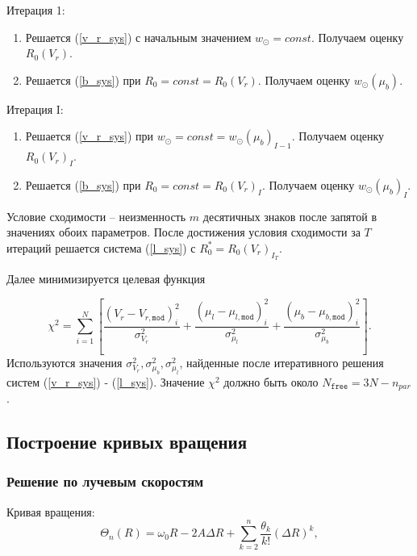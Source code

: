 \documentclass{matmex-diploma-custom}
\begin{document}
Итерация 1:
\begin{enumerate}
        \item Решается (\ref{v_r_sys}) с начальным значением $w_{\odot} = const$. Получаем оценку $R_0(V_r)$.
        \item Решается (\ref{b_sys}) при $R_0 = const = R_0(V_r)$. Получаем оценку $w_{\odot}(\mu_b)$.
\end{enumerate}
\par Итерация I:
\begin{enumerate}
        \item Решается (\ref{v_r_sys}) при $w_{\odot} = const = w_{\odot}(\mu_b)_{I - 1}$. Получаем оценку $R_0(V_r)_I$.
        \item Решается (\ref{b_sys}) при $R_0 = const = R_0(V_r)_I$. Получаем оценку $w_{\odot}(\mu_b)_I$.
\end{enumerate}
Условие сходимости -- неизменность $m$ десятичных знаков после запятой в значениях обоих параметров. После достижения условия сходимости за $T$ итераций решается система (\ref{l_sys}) с $R_0^{*}=R_0(V_r)_{I_T}$.

Далее минимизируется целевая функция

\begin{equation} \label{chi_sq_func}
                \chi^2 = \sum^N_{i = 1} \left[ \frac{\left( V_r - V_{r, \texttt{mod}} \right)^2_i}{\sigma^2_{V_r}} + \frac{\left( \mu_l - \mu_{l, \texttt{mod}} \right)^2_i}{\sigma^2_{\mu_l}} + \frac{\left( \mu_b - \mu_{b, \texttt{mod}} \right)^2_i}{\sigma^2_{\mu_b}} \right].
	\end{equation}
Используются значения $\sigma^2_{V_r}, \sigma^2_{\mu_b}, \sigma^2_{\mu_l}$, найденные после итеративного решения систем (\ref{v_r_sys}) - (\ref{l_sys}). Значение $\chi^2$ должно быть около $N_{\texttt{free}} = 3 N - n_{par}$. 

\pagebreak
\subsection{Построение кривых вращения}
\subsubsection{Решение по лучевым скоростям}
Кривая вращения:
\begin{equation}
        \Theta_n(R) = \omega_0 R - 2A\Delta R + \sum^n_{k = 2} \frac{\theta_k}{k!} \left( \Delta R \right)^k ,
\end{equation}
\end{document}

